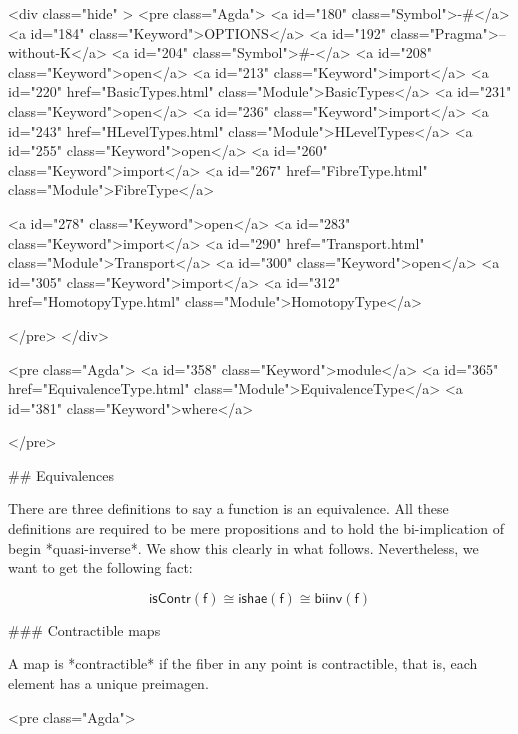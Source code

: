   <div class="hide" >
<pre class="Agda">
<a id="180" class="Symbol">{-#</a> <a id="184" class="Keyword">OPTIONS</a> <a id="192" class="Pragma">--without-K</a> <a id="204" class="Symbol">#-}</a>
<a id="208" class="Keyword">open</a> <a id="213" class="Keyword">import</a> <a id="220" href="BasicTypes.html" class="Module">BasicTypes</a>
<a id="231" class="Keyword">open</a> <a id="236" class="Keyword">import</a> <a id="243" href="HLevelTypes.html" class="Module">HLevelTypes</a>
<a id="255" class="Keyword">open</a> <a id="260" class="Keyword">import</a> <a id="267" href="FibreType.html" class="Module">FibreType</a>

<a id="278" class="Keyword">open</a> <a id="283" class="Keyword">import</a> <a id="290" href="Transport.html" class="Module">Transport</a>
<a id="300" class="Keyword">open</a> <a id="305" class="Keyword">import</a> <a id="312" href="HomotopyType.html" class="Module">HomotopyType</a>

</pre>
</div>

<pre class="Agda">
<a id="358" class="Keyword">module</a> <a id="365" href="EquivalenceType.html" class="Module">EquivalenceType</a> <a id="381" class="Keyword">where</a>

</pre>

## Equivalences

There are three definitions to say a function is an
equivalence. All these definitions
are required to be mere propositions and to hold
the bi-implication of begin *quasi-inverse*. We show
this clearly in what follows. Nevertheless, we want to get
the following fact:

$$\mathsf{isContr(f)} \cong \mathsf{ishae(f)} \cong \mathsf{biinv(f)} $$

### Contractible maps

A map is *contractible* if the fiber in any point is contractible, that is, each
element has a unique preimagen.

<pre class="Agda">

